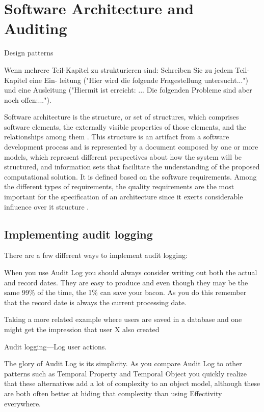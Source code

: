 %
\chapter{Software Architecture and Auditing}\label{chap:sadt}
Design patterns

Wenn mehrere Teil-Kapitel zu strukturieren sind: Schreiben Sie zu jedem Teil-Kapitel eine Ein- leitung ("Hier wird die folgende Fragestellung untersucht...") und eine Ausleitung ("Hiermit ist erreicht: ... Die folgenden Probleme sind aber noch offen:...").

Software architecture is the structure, or set of structures, which comprises
software elements, the externally visible properties of those elements, and the
relationships among them \citep{SAIP}. This structure is an artifact from a software
development process and is represented by a document composed by one or more
models, which represent different perspectives about how the system will be
structured, and information sets that facilitate the understanding of the proposed
computational solution. It is defined based on the software requirements. Among the
different types of requirements, the quality requirements are the most important for
the specification of an architecture since it exerts considerable influence over it
structure \citep{SAIP}.

\section{Implementing audit logging}

There are a few different ways to implement audit logging:~\citep{richardson2018microservices}

When you use Audit Log you should always consider writing out both the actual and record dates. They are easy to produce and even though they may be the same 99\% of the time, the 1\% can save your bacon. As you do this remember that the record date is always the current processing date. \citep{AuditLog}

Taking a more related example where users are saved in a database and one might get the impression that user X also created 

Audit logging—Log user actions.

The glory of Audit Log is its simplicity. As you compare Audit Log to other patterns such as Temporal Property and Temporal Object you quickly realize that these alternatives add a lot of complexity to an object model, although these are both often better at hiding that complexity than using Effectivity everywhere.

